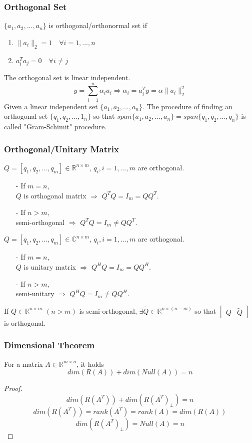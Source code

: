 \begin{multicols}{2}
\subsubsection{Orthogonal Set}
$\{a_1,a_2,...,a_n\}$ is orthogonal/orthonormal set if
\begin{enumerate}
    \item $\|a_i\|_2=1\quad \forall i=1,...,n$
    \item $a_i^Ta_j= 0\quad \forall i\neq j$
\end{enumerate}
The orthogonal set is linear independent.
\[
    y=\sum_{i=1}^n\alpha_ia_i \Longrightarrow \alpha_i=a_i^Ty=\alpha \|a_i\|_2^2
\]
Given a linear independent set $\{a_1,a_2,...,a_n\}$. The procedure of finding an orthogonal 
set $\{q_1,q_2,...,1_n\}$ so that $span\{a_1,a_2,...,a_n\}=span\{q_1,q_2,...,q_n\}$ is called 
"Gram-Schimit" procedure.

\subsubsection{Orthogonal/Unitary Matrix}
$Q = [q_1,q_2,...,q_m]\in\mathbb{R}^{n\times m}$, $q_i,i=1,...,m$ are orthogonal.
\begin{itemize}
    \item [-] If $m=n$, \\ $Q$ is orthogonal matrix $\Longrightarrow$ $Q^TQ=I_m=QQ^T$.
    \item [-] If $n>m$, \\ semi-orthogonal $\Longrightarrow$ $Q^TQ=I_m\neq QQ^T$.
\end{itemize}
$Q = [q_1,q_2,...,q_m]\in\mathbb{C}^{n\times m}$, $q_i,i=1,...,m$ are orthogonal.
\begin{itemize}
    \item [-] If $m=n$, \\ $Q$ is unitary matrix $\Longrightarrow$ $Q^HQ=I_m=QQ^H$.
    \item [-] If $n>m$, \\ semi-unitary $\Longrightarrow$ $Q^HQ=I_m\neq QQ^H$.
\end{itemize}
If $Q\in\mathbb{R}^{n\times m}$ $(n>m)$ is semi-orthogonal, $\exists\tilde{Q}\in\mathbb{R}^{n\times(n-m)}$ so that 
$\left[\begin{array}{cc}Q&\tilde{Q}\end{array}\right]$ is orthogonal.
\subsubsection{Dimensional Theorem}
For a matrix $A\in\mathbb{R}^{m\times n}$, it holds
\[
    dim(R(A))+dim(Null(A))=n
\]
\begin{proof}
    \[
        dim(R(A^T))+dim(R(A^T)_\bot)=n
    \]
    \[
        dim(R(A^T))=rank(A^T)=rank(A)=dim(R(A))
    \]
    \[
        dim(R(A^T)_\bot)=Null(A)=n
    \]
\end{proof}


\end{multicols}
